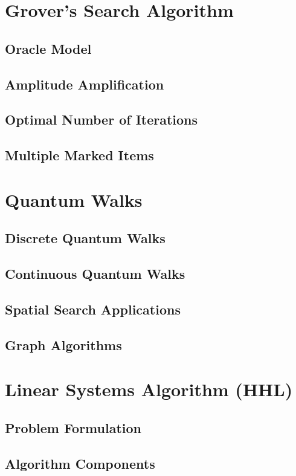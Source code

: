 \documentclass[12pt,a4paper]{book}
\begin{document}
\section{Grover's Search Algorithm}
\subsection{Oracle Model}
\subsection{Amplitude Amplification}
\subsection{Optimal Number of Iterations}
\subsection{Multiple Marked Items}

\section{Quantum Walks}
\subsection{Discrete Quantum Walks}
\subsection{Continuous Quantum Walks}
\subsection{Spatial Search Applications}
\subsection{Graph Algorithms}

\section{Linear Systems Algorithm (HHL)}
\subsection{Problem Formulation}
\subsection{Algorithm Components}
\end{document}

